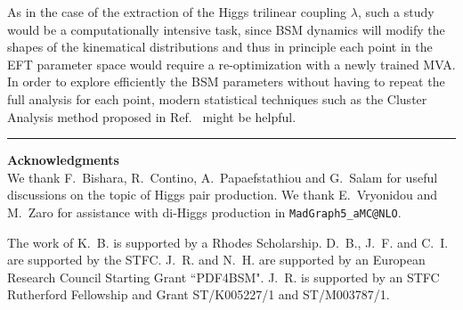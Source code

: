 As in the case of the extraction of the Higgs
trilinear coupling $\lambda$, such a study
would be a computationally intensive task, since
BSM dynamics will modify the shapes of the kinematical
distributions and thus in principle each point in the EFT parameter
space would require a re-optimization with a newly trained
MVA.
%
In order to explore efficiently the BSM parameters
without having to repeat the full analysis
for each point, modern statistical techniques
such as the Cluster Analysis method proposed
in Ref.~\cite{Dall'Osso:2015aia} might be helpful.



\bigskip
\bigskip
\begin{center}
\rule{5cm}{.1pt}
\end{center}
\bigskip
\bigskip

{\bf\noindent  Acknowledgments \\}
We thank F.~Bishara, R.~Contino, A.~Papaefstathiou and
G.~Salam for useful discussions on the topic
of Higgs pair production.
%
We thank E.~Vryonidou and M.~Zaro for
assistance with di-Higgs production
  in {\tt MadGraph5\_aMC@NLO}.

  \noindent
  The work of K.~B. is supported by a Rhodes Scholarship.
  D.~B., J.~F. and C.~I. are supported by the STFC.
  J.~R. and N.~H. are
supported by an European Research Council Starting Grant ``PDF4BSM".
%
  J.~R. is supported by an STFC Rutherford Fellowship and
  Grant ST/K005227/1 and ST/M003787/1.
